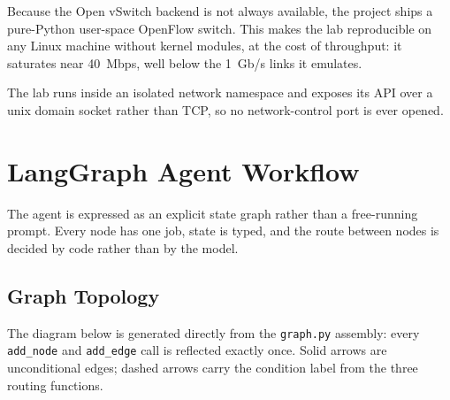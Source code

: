 \documentclass[12pt,a4paper]{report}
\begin{document}
Because the Open vSwitch backend is not always available, the project ships a
pure-Python user-space OpenFlow switch. This makes the lab reproducible on any
Linux machine without kernel modules, at the cost of throughput: it saturates
near 40~Mbps, well below the 1~Gb/s links it emulates.

The lab runs inside an isolated network namespace and exposes its API over a
unix domain socket rather than TCP, so no network-control port is ever opened.

\section{LangGraph Agent Workflow}

The agent is expressed as an explicit state graph rather than a free-running
prompt. Every node has one job, state is typed, and the route between nodes is
decided by code rather than by the model.

\subsection{Graph Topology}

The diagram below is generated directly from the \texttt{graph.py} assembly:
every \texttt{add\_node} and \texttt{add\_edge} call is reflected exactly once.
Solid arrows are unconditional edges; dashed arrows carry the condition label
from the three routing functions.
\end{document}
